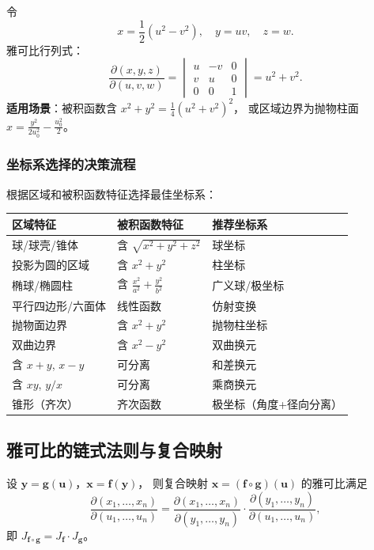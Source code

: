 \documentclass{ctexart}
\begin{document}
令
\[
  x = \frac{1}{2}(u^2 - v^2), \quad y = uv, \quad z = w.
\]
雅可比行列式：
\[
  \frac{\partial(x,y,z)}{\partial(u,v,w)} = \begin{vmatrix} u & -v & 0 \\ v & u & 0 \\ 0 & 0 & 1 \end{vmatrix}
  = u^2 + v^2.
\]
\textbf{适用场景}：被积函数含 $x^2+y^2 = \frac{1}{4}(u^2+v^2)^2$，
或区域边界为抛物柱面 $x = \frac{y^2}{2u_0^2} - \frac{u_0^2}{2}$。

\subsubsection*{坐标系选择的决策流程}

根据区域和被积函数特征选择最佳坐标系：

\begin{center}
\renewcommand{\arraystretch}{1.4}
\begin{tabular}{>{\raggedright\arraybackslash}p{3.8cm}
                >{\raggedright\arraybackslash}p{3.5cm}
                >{\raggedright\arraybackslash}p{4cm}}
  \toprule
  \textbf{区域特征} & \textbf{被积函数特征} & \textbf{推荐坐标系} \\
  \midrule
  球/球壳/锥体 & 含 $\sqrt{x^2+y^2+z^2}$ & 球坐标 \\
  投影为圆的区域 & 含 $x^2+y^2$ & 柱坐标 \\
  椭球/椭圆柱 & 含 $\frac{x^2}{a^2}+\frac{y^2}{b^2}$ & 广义球/极坐标 \\
  平行四边形/六面体 & 线性函数 & 仿射变换 \\
  抛物面边界 & 含 $x^2+y^2$ & 抛物柱坐标 \\
  双曲边界 & 含 $x^2-y^2$ & 双曲换元 \\
  含 $x+y$, $x-y$ & 可分离 & 和差换元 \\
  含 $xy$, $y/x$ & 可分离 & 乘商换元 \\
  锥形（齐次） & 齐次函数 & 极坐标（角度+径向分离） \\
  \bottomrule
\end{tabular}
\end{center}

\subsection{雅可比的链式法则与复合映射}

\begin{theorem}[链式法则]
  设 $\mathbf{y} = \mathbf{g}(\mathbf{u})$，$\mathbf{x} = \mathbf{f}(\mathbf{y})$，
  则复合映射 $\mathbf{x} = (\mathbf{f} \circ \mathbf{g})(\mathbf{u})$ 的雅可比满足
  \[
    \frac{\partial(x_1,\ldots,x_n)}{\partial(u_1,\ldots,u_n)}
    = \frac{\partial(x_1,\ldots,x_n)}{\partial(y_1,\ldots,y_n)}
      \cdot \frac{\partial(y_1,\ldots,y_n)}{\partial(u_1,\ldots,u_n)},
  \]
  即 $J_{\mathbf{f} \circ \mathbf{g}} = J_{\mathbf{f}} \cdot J_{\mathbf{g}}$。
\end{theorem}
\end{document}
